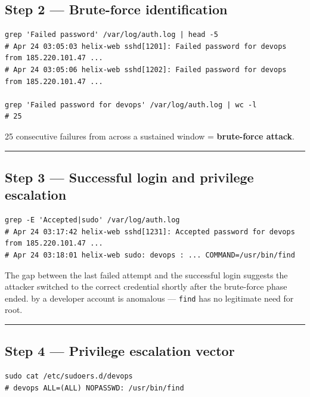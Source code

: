 \subsection{Step 2 --- Brute-force identification}

\begin{lstlisting}
grep 'Failed password' /var/log/auth.log | head -5
# Apr 24 03:05:03 helix-web sshd[1201]: Failed password for devops from 185.220.101.47 ...
# Apr 24 03:05:06 helix-web sshd[1202]: Failed password for devops from 185.220.101.47 ...

grep 'Failed password for devops' /var/log/auth.log | wc -l
# 25
\end{lstlisting}

25 consecutive failures from  across a sustained window = \textbf{brute-force attack}.

\begin{center}\rule{0.5\linewidth}{0.5pt}\end{center}

\subsection{Step 3 --- Successful login and privilege escalation}

\begin{lstlisting}
grep -E 'Accepted|sudo' /var/log/auth.log
# Apr 24 03:17:42 helix-web sshd[1231]: Accepted password for devops from 185.220.101.47 ...
# Apr 24 03:18:01 helix-web sudo: devops : ... COMMAND=/usr/bin/find
\end{lstlisting}

The gap between the last failed attempt and the successful login suggests the attacker switched to the correct credential shortly after the brute-force phase ended.  by a developer account is anomalous --- \texttt{find} has no legitimate need for root.

\begin{center}\rule{0.5\linewidth}{0.5pt}\end{center}

\subsection{Step 4 --- Privilege escalation vector}

\begin{lstlisting}
sudo cat /etc/sudoers.d/devops
# devops ALL=(ALL) NOPASSWD: /usr/bin/find
\end{lstlisting}

